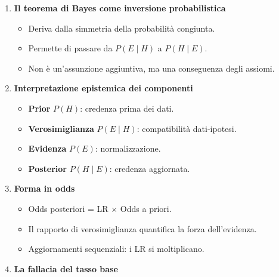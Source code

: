 \documentclass[
  italian,
  letterpaper,
  a4paper,
  11pt,
  open=any]{scrbook}
\providecommand{\tightlist}{%
  \setlength{\itemsep}{0pt}\setlength{\parskip}{0pt}}
\theoremstyle{plain}
\theoremstyle{definition}
\theoremstyle{definition}
\theoremstyle{remark}
\begin{document}
\begin{tcolorbox}[enhanced jigsaw, arc=.35mm, bottomrule=.15mm, bottomtitle=1mm, breakable, colback=white, colbacktitle=quarto-callout-important-color!10!white, colframe=quarto-callout-important-color-frame, coltitle=black, left=2mm, leftrule=.75mm, opacityback=0, opacitybacktitle=0.6, rightrule=.15mm, title=\textcolor{quarto-callout-important-color}{\faExclamation}\hspace{0.5em}{Importante}, titlerule=0mm, toprule=.15mm, toptitle=1mm]

\begin{enumerate}
\def\labelenumi{\arabic{enumi}.}
\tightlist
\item
  \textbf{Il teorema di Bayes come inversione probabilistica}

  \begin{itemize}
  \tightlist
  \item
    Deriva dalla simmetria della probabilità congiunta.
  \item
    Permette di passare da \(P(E \mid H)\) a \(P(H \mid E)\).
  \item
    Non è un'assunzione aggiuntiva, ma una conseguenza degli assiomi.
  \end{itemize}
\item
  \textbf{Interpretazione epistemica dei componenti}

  \begin{itemize}
  \tightlist
  \item
    \textbf{Prior} \(P(H)\): credenza prima dei dati.
  \item
    \textbf{Verosimiglianza} \(P(E \mid H)\): compatibilità
    dati-ipotesi.
  \item
    \textbf{Evidenza} \(P(E)\): normalizzazione.
  \item
    \textbf{Posterior} \(P(H \mid E)\): credenza aggiornata.
  \end{itemize}
\item
  \textbf{Forma in odds}

  \begin{itemize}
  \tightlist
  \item
    Odds posteriori = LR × Odds a priori.
  \item
    Il rapporto di verosimiglianza quantifica la forza dell'evidenza.
  \item
    Aggiornamenti sequenziali: i LR si moltiplicano.
  \end{itemize}
\item
  \textbf{La fallacia del tasso base}


\end{enumerate}
\end{tcolorbox}
\end{document}
